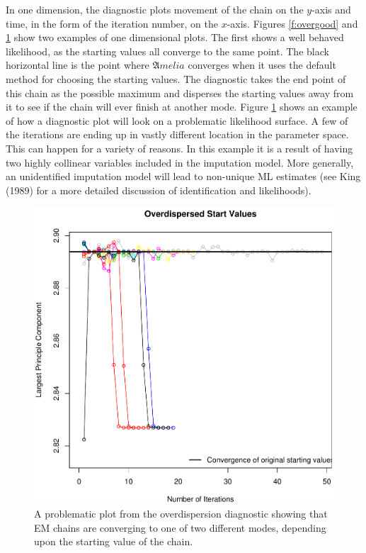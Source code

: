 \documentclass[12pt,titlepage]{article}
\newcommand{\Amelia}{\ensuremath{\mathfrak Amelia} }
\begin{document}
In one dimension, the diagnostic plots movement of the chain on the
$y$-axis and time, in the form of the iteration number, on the
$x$-axis.  Figures \ref{f:overgood} and \ref{f:overbad} show two
examples of one dimensional plots.  The first shows a well behaved
likelihood, as the starting values all converge to the same point.
The black horizontal line is the point where \Amelia converges when it
uses the default method for choosing the starting values.  The
diagnostic takes the end point of this chain as the possible maximum
and disperses the starting values away from it to see if the chain
will ever finish at another mode.  Figure \ref{f:overbad} shows an
example of how a diagnostic plot will look on a problematic likelihood
surface.  A few of the iterations are ending up in vastly different
location in the parameter space.  This can happen for a variety of
reasons.  In this example it is a result of having two highly
collinear variables included in the imputation model.  More generally,
an unidentified imputation model will lead to non-unique ML estimates
(see King (1989) for a more detailed discussion of identification and
likelihoods).
\begin{figure}\label{f:overbad}
  \centering \includegraphics[scale=.5]{disperse-bad}
  \caption{ A problematic plot from the overdispersion diagnostic
    showing that EM chains are converging to one of two different
    modes, depending upon the starting value of the chain.}
\end{figure}
\end{document}
